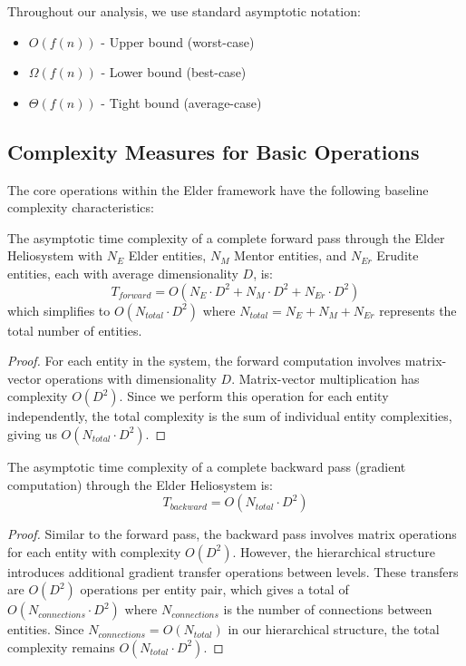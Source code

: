 Throughout our analysis, we use standard asymptotic notation:
\begin{itemize}
    \item $O(f(n))$ - Upper bound (worst-case)
    \item $\Omega(f(n))$ - Lower bound (best-case)
    \item $\Theta(f(n))$ - Tight bound (average-case)
\end{itemize}

\subsection{Complexity Measures for Basic Operations}

The core operations within the Elder framework have the following baseline complexity characteristics:

\begin{theorem}
The asymptotic time complexity of a complete forward pass through the Elder Heliosystem with $N_E$ Elder entities, $N_M$ Mentor entities, and $N_{Er}$ Erudite entities, each with average dimensionality $D$, is:
\begin{equation}
T_{forward} = O(N_E \cdot D^2 + N_M \cdot D^2 + N_{Er} \cdot D^2)
\end{equation}
which simplifies to $O(N_{total} \cdot D^2)$ where $N_{total} = N_E + N_M + N_{Er}$ represents the total number of entities.
\end{theorem}

\begin{proof}
For each entity in the system, the forward computation involves matrix-vector operations with dimensionality $D$. Matrix-vector multiplication has complexity $O(D^2)$. Since we perform this operation for each entity independently, the total complexity is the sum of individual entity complexities, giving us $O(N_{total} \cdot D^2)$.
\end{proof}

\begin{theorem}
The asymptotic time complexity of a complete backward pass (gradient computation) through the Elder Heliosystem is:
\begin{equation}
T_{backward} = O(N_{total} \cdot D^2)
\end{equation}
\end{theorem}

\begin{proof}
Similar to the forward pass, the backward pass involves matrix operations for each entity with complexity $O(D^2)$. However, the hierarchical structure introduces additional gradient transfer operations between levels. These transfers are $O(D^2)$ operations per entity pair, which gives a total of $O(N_{connections} \cdot D^2)$ where $N_{connections}$ is the number of connections between entities. Since $N_{connections} = O(N_{total})$ in our hierarchical structure, the total complexity remains $O(N_{total} \cdot D^2)$.
\end{proof}

